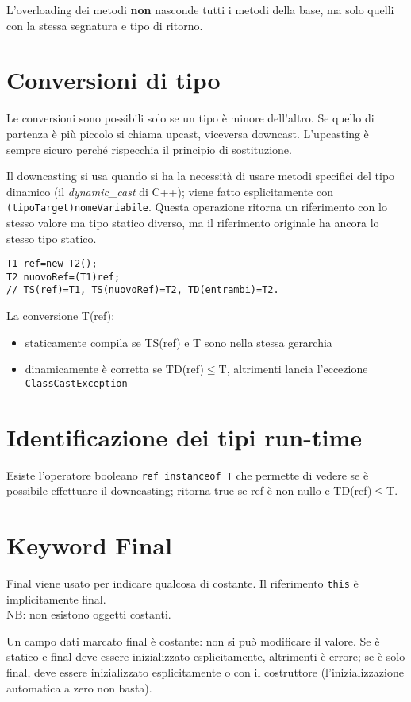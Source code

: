 L'overloading dei metodi \textbf{non} nasconde tutti i metodi della base, ma solo quelli con la stessa segnatura e tipo di ritorno.

\section{Conversioni di tipo} %
Le conversioni sono possibili solo se un tipo è minore dell'altro. Se quello di partenza è più piccolo si chiama upcast, viceversa downcast.
L'upcasting è sempre sicuro perché rispecchia il principio di sostituzione.

Il downcasting si usa quando si ha la necessità di usare metodi specifici del tipo dinamico (il \textit{dynamic\_cast} di C++); viene fatto esplicitamente con \texttt{(tipoTarget)nomeVariabile}. Questa operazione ritorna un riferimento con lo stesso valore ma tipo statico diverso, ma il riferimento originale ha ancora lo stesso tipo statico.
\begin{lstlisting}
T1 ref=new T2();
T2 nuovoRef=(T1)ref;
// TS(ref)=T1, TS(nuovoRef)=T2, TD(entrambi)=T2.
\end{lstlisting}
La conversione T(ref):
\begin{itemize}
\item  staticamente compila se TS(ref) e T sono nella stessa gerarchia
\item  dinamicamente è corretta se TD(ref)$\le$T, altrimenti lancia l'eccezione \texttt{ClassCastException}
\end{itemize}

\section{Identificazione dei tipi run-time} %
Esiste l'operatore booleano \texttt{ref instanceof T} che permette di vedere se è possibile effettuare il downcasting; ritorna true se ref è non nullo e TD(ref)$\le$T.

\section{Keyword Final} %
Final viene usato per indicare qualcosa di costante. Il riferimento \texttt{this} è implicitamente final. \\
NB: non esistono oggetti costanti.

Un campo dati marcato final è costante: non si può modificare il valore. Se è  statico e final deve essere inizializzato esplicitamente, altrimenti è errore; se è solo final, deve essere inizializzato esplicitamente o con il costruttore (l'inizializzazione automatica a zero non basta).

